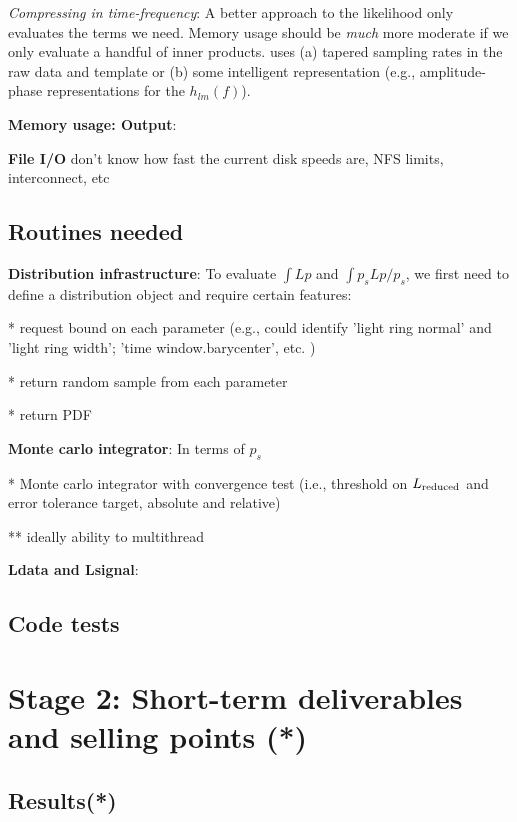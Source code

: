 \documentclass[twocolumn,prd,nofootinbib]{revtex4}
\newcommand\editremark[1]{{\color{red} #1}}
\begin{document}
\noindent \emph{Compressing in time-frequency}: A better approach to the likelihood only evaluates the terms we need.
Memory usage should be \emph{much} more moderate if we only evaluate a handful of inner products. uses (a) tapered sampling rates in
the raw data and template or (b) some intelligent representation (e.g., amplitude-phase representations for the $h_{lm}(f)$).

\noindent \textbf{Memory usage: Output}: 

\noindent \textbf{File I/O} \editremark{don't know} how fast the current disk speeds are, NFS limits, interconnect, etc


\subsection{Routines needed}

\noindent \textbf{Distribution infrastructure}: To evaluate $\int L p$ and $\int p_s L p/p_s$, we first need to define
a distribution object and require certain features:

* request bound on each parameter (e.g., could identify 'light ring normal' and 'light ring width'; 'time
window.barycenter', etc. )

* return random sample from each parameter

* return PDF


\noindent \textbf{Monte carlo integrator}: In terms of $p_s$

* Monte carlo integrator with convergence test (i.e., threshold on $L_{\rm reduced}$ and error tolerance target,
absolute and relative)

** ideally ability to multithread


\noindent \textbf{Ldata and Lsignal}: 



\subsection{Code tests}




\section{Stage 2: Short-term deliverables and selling points (*)} 

\subsection{Results(*)}
\end{document}

